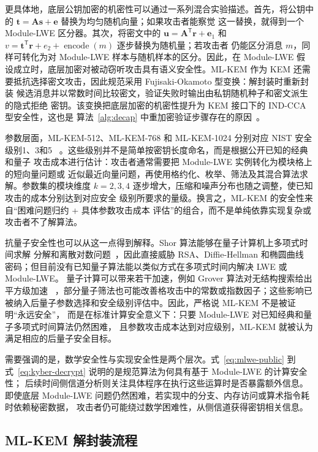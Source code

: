 \documentclass[a4paper,fontset=none]{ctexart}
\begin{document}
更具体地，底层公钥加密的机密性可以通过一系列混合实验描述。首先，将公钥中的
$\bm{t}=\bm{A}\bm{s}+\bm{e}$ 替换为均匀随机向量；如果攻击者能察觉
这一替换，就得到一个 Module-LWE 区分器。其次，将密文中的
$\bm{u}=\bm{A}^{\mathsf{T}}\bm{r}+\bm{e}_1$ 和
$v=\bm{t}^{\mathsf{T}}\bm{r}+e_2+\operatorname{encode}(m)$ 逐步替换为随机量；若攻击者
仍能区分消息 $m$，同样可转化为对 Module-LWE 样本与随机样本的区分。因此，在
Module-LWE 假设成立时，底层加密对被动窃听攻击具有语义安全性。ML-KEM 作为 KEM
还需要抵抗选择密文攻击，因此规范采用 Fujisaki-Okamoto 型变换：解封装时重新封装
候选消息并以常数时间比较密文，验证失败时输出由私钥随机种子和密文派生的隐式拒绝
密钥。该变换把底层加密的机密性提升为 KEM 接口下的 IND-CCA 型安全性，这也是
算法~\ref{alg:decap} 中重加密验证步骤存在的原因~\cite{Bos2018,Kyber2021}。

参数层面，ML-KEM-512、ML-KEM-768 和 ML-KEM-1024 分别对应 NIST 安全级别1、3和5
~\cite{FIPS203}。这些级别并不是简单按密钥长度命名，而是根据公开已知的经典和量子
攻击成本进行估计：攻击者通常需要把 Module-LWE 实例转化为模块格上的短向量问题或
近似最近向量问题，再使用格约化、枚举、筛法及其混合算法求解。参数集的模块维度
$k=2,3,4$ 逐步增大，压缩和噪声分布也随之调整，使已知攻击的成本分别达到对应安全
级别所要求的量级。换言之，ML-KEM 的安全性来自``困难问题归约 + 具体参数攻击成本
评估''的组合，而不是单纯依靠实现复杂或攻击者不了解算法。

抗量子安全性也可以从这一点得到解释。Shor 算法能够在量子计算机上多项式时间求解
分解和离散对数问题~\cite{Shor1994}，因此直接威胁 RSA、Diffie-Hellman 和椭圆曲线
密码；但目前没有已知量子算法能以类似方式在多项式时间内解决 LWE 或 Module-LWE。
量子计算可以带来若干加速，例如 Grover 算法对无结构搜索给出平方级加速
~\cite{Grover1996}，部分量子筛法也可能改善格攻击中的常数或指数因子；这些影响已
被纳入后量子参数选择和安全级别评估中。因此，严格说 ML-KEM 不是被证明``永远安全''，
而是在标准计算安全意义下：只要 Module-LWE 对已知经典和量子多项式时间算法仍然困难，
且参数攻击成本达到对应级别，ML-KEM 就被认为满足相应的后量子安全目标。

需要强调的是，数学安全性与实现安全性是两个层次。式~\eqref{eq:mlwe-public} 到
式~\eqref{eq:kyber-decrypt} 说明的是规范算法为何具有基于 Module-LWE 的计算安全性；
后续时间侧信道分析则关注具体程序在执行这些运算时是否暴露额外信息。即使底层
Module-LWE 问题仍然困难，若实现中的分支、内存访问或算术指令耗时依赖秘密数据，
攻击者仍可能绕过数学困难性，从侧信道获得密钥相关信息。

\subsection{ML-KEM 解封装流程}
\label{sec:mlkem-decap}
\end{document}
